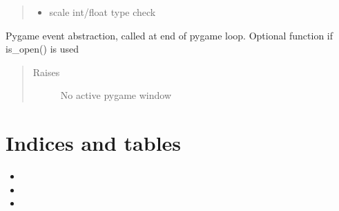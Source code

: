\documentclass[letterpaper,10pt,english]{sphinxmanual}
\begin{document}
\begin{fulllineitems}
\begin{fulllineitems}
\begin{quote}
\begin{description}
\begin{itemize}
\item {} 
\sphinxAtStartPar
{} \textendash{} scale int/float type check

\end{itemize}

\end{description}\end{quote}

\end{fulllineitems}


\begin{fulllineitems}
\label{\detokenize{dpav:dpav.window.Window.update}}
\sphinxAtStartPar
Pygame event abstraction, called at end of pygame loop.
Optional function if is\_open() is used
\begin{quote}\begin{description}
\item[{Raises}] \leavevmode
\sphinxAtStartPar
{} \textendash{} No active pygame window

\end{description}\end{quote}

\end{fulllineitems}


\end{fulllineitems}



\chapter{Indices and tables}
\label{\detokenize{index:indices-and-tables}}\begin{itemize}
\item {} 
\sphinxAtStartPar
{}

\item {} 
\sphinxAtStartPar
{}

\item {} 
\sphinxAtStartPar
{}

\end{itemize}
\end{document}
